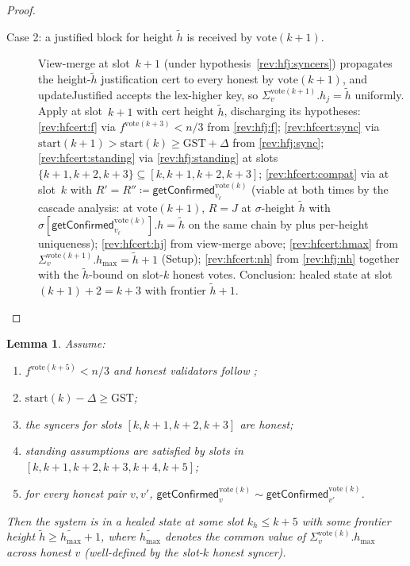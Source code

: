 \documentclass{article}
\newcommand{\hmax}{\ensuremath{h_{\max}}\xspace}
\newcommand{\start}{\ensuremath{\mathrm{start}}}
\newcommand{\vote}{\ensuremath{\mathrm{vote}}}
\newcommand{\GST}{\ensuremath{\mathrm{GST}}\xspace}
\newcommand{\comm}[1]{\ensuremath{\widetilde{#1}}}
\newcommand{\updateJustified}{\textsf{updateJustified}\xspace}
\newcommand{\getConfirmed}{\textsf{getConfirmed}\xspace}
\theoremstyle{plain}
\newtheorem{lemma}{Lemma}
\theoremstyle{definition}
\theoremstyle{remark}
\begin{document}
\begin{proof}
\begin{description}
  \item[Case 2: a justified block for height $\comm{h}$ is received by $\vote(k+1)$.]
  View-merge at slot~$k+1$ (under hypothesis~\ref{rev:hfj:syncers}) propagates the height-$\comm{h}$ justification cert to every honest by $\vote(k+1)$, and \updateJustified{} accepts the lex-higher key, so $\Sigma_v^{\vote(k+1)}.h_j = \comm{h}$ uniformly.
  Apply  at slot~$k+1$ with cert height $\comm{h}$, discharging its hypotheses:
  \ref{rev:hfcert:f} via $f^{\vote(k+3)} < n/3$ from \ref{rev:hfj:f};
  \ref{rev:hfcert:sync} via $\start(k+1) > \start(k) \geq \GST + \Delta$ from \ref{rev:hfj:sync};
  \ref{rev:hfcert:standing} via \ref{rev:hfj:standing} at slots $\{k+1, k+2, k+3\} \subseteq [k,k+1,k+2,k+3]$;
  \ref{rev:hfcert:compat} via  at slot~$k$ with $R' = R'' \coloneqq \getConfirmed_{v_\ell}^{\vote(k)}$ (viable at both times by the cascade analysis: at $\vote(k+1)$, $R = J$ at $\sigma$-height $\comm{h}$ with $\sigma[\getConfirmed_{v_\ell}^{\vote(k)}].h = \comm{h}$ on the same chain by  plus per-height uniqueness);
  \ref{rev:hfcert:hj} from view-merge above;
  \ref{rev:hfcert:hmax} from $\Sigma_v^{\vote(k+1)}.\hmax = \comm{h}+1$ (Setup);
  \ref{rev:hfcert:nh} from \ref{rev:hfj:nh} together with the $\comm{h}$-bound on slot-$k$ honest votes.
  Conclusion: healed state at slot $(k+1)+2 = k+3$ with frontier $\comm{h}+1$.
\end{description}
\end{proof}

\begin{lemma}\label{lem:healing-from-compat}
Assume:
\begin{enumerate}
  \item\label{rev:hfc:f} $f^{\vote(k+5)} < n/3$ and honest validators follow ;
  \item\label{rev:hfc:sync} $\start(k) - \Delta \geq \GST$;
  \item\label{rev:hfc:syncers} the syncers for slots $[k,k+1,k+2,k+3]$ are honest;
  \item\label{rev:hfc:standing} standing assumptions are satisfied by slots in $[k,k+1,k+2,k+3,k+4,k+5]$;
  \item\label{rev:hfc:compat} for every honest pair $v, v'$, $\getConfirmed_v^{\vote(k)} \sim \getConfirmed_{v'}^{\vote(k)}$.
\end{enumerate}
Then the system is in a healed state at some slot $k_h \leq k+5$ with some frontier height $\comm{h} \geq \comm{\hmax}+1$, where $\comm{\hmax}$ denotes the common value of $\Sigma_v^{\vote(k)}.\hmax$ across honest $v$ (well-defined by the slot-$k$ honest syncer).
\end{lemma}
\end{document}
